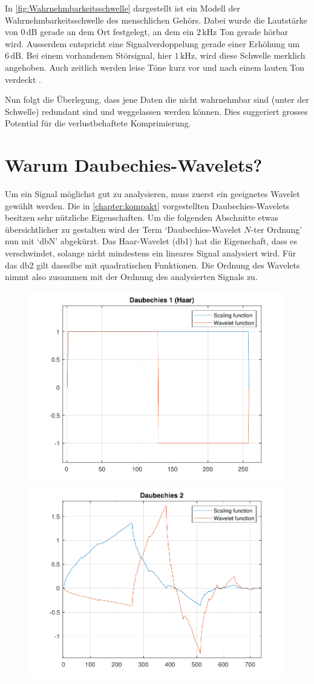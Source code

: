 \begin{refsection}
In \autoref{fig:Wahrnehmbarkeitsschwelle} dargestellt ist ein Modell der Wahrnehmbarkeitsschwelle des menschlichen Gehörs.
Dabei wurde die Lautstärke von $0\,\text{dB}$ gerade an dem Ort festgelegt, an dem ein $2\,\text{kHz}$ Ton gerade hörbar wird.
Ausserdem entspricht eine Signalverdoppelung gerade einer Erhöhung um $6\,\text{dB}$. 
Bei einem vorhandenen Störsignal, hier $1\,\text{kHz}$, wird diese Schwelle merklich angehoben.
Auch zeitlich werden leise Töne kurz vor und nach einem lauten Ton verdeckt \cite{wikipedia:Psychoakustik}.

Nun folgt die Überlegung, dass jene Daten die nicht wahrnehmbar sind (unter der Schwelle) redundant sind und weggelassen werden können.
Dies suggeriert grosses Potential für die verlustbehaftete Komprimierung.

\section{Warum Daubechies-Wavelets?}
\label{chapter:daubechies}
Um ein Signal möglichst gut zu analysieren, muss zuerst ein geeignetes Wavelet gewählt werden.
Die in \autoref{chapter:kompakt} vorgestellten Daubechies-Wavelets besitzen sehr nützliche Eigenschaften.
Um die folgenden Abschnitte etwas übersichtlicher zu gestalten wird der Term `Daubechies-Wavelet $N$-ter Ordnung' nun mit `dbN' abgekürzt.
Das Haar-Wavelet (db1) hat die Eigenschaft, dass es verschwindet, solange nicht mindestens ein lineares Signal analysiert wird.
Für das db2 gilt dasselbe mit quadratischen Funktionen. 
Die Ordnung des Wavelets nimmt also zusammen mit der Ordnung des analysierten Signals zu.
\begin{figure}
	\includegraphics[width=0.5\linewidth]{papers/compress/Bilder/db1}
	\includegraphics[width=0.5\linewidth]{papers/compress/Bilder/db2}

\end{figure}
\end{refsection}
